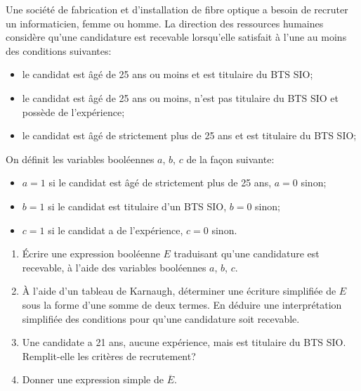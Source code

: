 \begin{exercice}
    Une société de fabrication et d'installation de fibre optique a besoin de recruter un informaticien, femme ou homme. La direction des ressources humaines considère qu'une candidature est recevable lorsqu'elle satisfait à l'une au moins des conditions suivantes:

    \begin{itemize}
        \item le candidat est âgé de 25 ans ou moins et est titulaire du BTS SIO;
        \item le candidat est âgé de 25 ans ou moins, n'est pas titulaire du BTS SIO et possède de l'expérience;
        \item le candidat est âgé de strictement plus de 25 ans  et est titulaire du BTS SIO;
    \end{itemize}

    \smallskip
    On définit les variables booléennes $a$, $b$, $c$ de la façon suivante:
    \begin{itemize}
        \item $a=1$ si le candidat est âgé de strictement plus de 25 ans, $a=0$ sinon;
        \item $b=1$ si le candidat est titulaire d'un BTS SIO, $b=0$ sinon;
        \item $c=1$ si le candidat a de l'expérience, $c=0$ sinon.
    \end{itemize}

    \begin{enumerate}
        \item Écrire une expression booléenne $E$ traduisant qu'une candidature est recevable, à l'aide des variables booléennes $a$, $b$, $c$.
        \item À l'aide d'un tableau de Karnaugh, déterminer une écriture simplifiée de $E$ sous la forme d'une somme de deux termes. En déduire une interprétation simplifiée des conditions pour qu'une candidature soit recevable.
        \item Une candidate a 21 ans, aucune expérience, mais est titulaire du BTS SIO. Remplit-elle les critères de recrutement?
        \item Donner une expression simple de $\overline{E}$.\\
    \end{enumerate}
\end{exercice}

